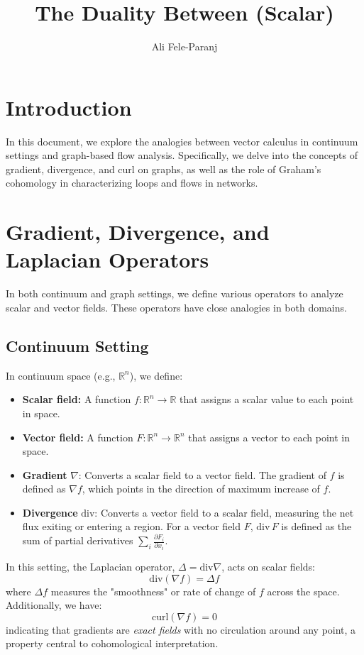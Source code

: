 \documentclass[10pt,a4paper,twocolumn]{article}
\title{The Duality Between (Scalar)}
\author{Ali Fele-Paranj}
\begin{document}
	\maketitle
	
	\section{Introduction}
	In this document, we explore the analogies between vector calculus in continuum settings and graph-based flow analysis. Specifically, we delve into the concepts of gradient, divergence, and curl on graphs, as well as the role of Graham's cohomology in characterizing loops and flows in networks.
	
	\section{Gradient, Divergence, and Laplacian Operators}
	In both continuum and graph settings, we define various operators to analyze scalar and vector fields. These operators have close analogies in both domains.
	
	\subsection{Continuum Setting}
	In continuum space (e.g., $\mathbb{R}^n$), we define:
	\begin{itemize}
		\item \textbf{Scalar field:} A function \( f \colon \mathbb{R}^n \rightarrow \mathbb{R} \) that assigns a scalar value to each point in space.
		\item \textbf{Vector field:} A function \( F \colon \mathbb{R}^n \rightarrow \mathbb{R}^n \) that assigns a vector to each point in space.
		\item \textbf{Gradient} \( \nabla \): Converts a scalar field to a vector field. The gradient of \( f \) is defined as \( \nabla f \), which points in the direction of maximum increase of \( f \).
		\item \textbf{Divergence} \( \text{div} \): Converts a vector field to a scalar field, measuring the net flux exiting or entering a region. For a vector field \( F \), \( \text{div} \, F \) is defined as the sum of partial derivatives \( \sum_{i} \frac{\partial F_i}{\partial x_i} \).
	\end{itemize}
	
	In this setting, the Laplacian operator, \( \Delta = \text{div} \nabla \), acts on scalar fields:
	\[
	\text{div}(\nabla f) = \Delta f
	\]
	where \( \Delta f \) measures the "smoothness" or rate of change of \( f \) across the space. Additionally, we have:
	\[
	\text{curl}(\nabla f) = 0
	\]
	indicating that gradients are \textit{exact fields} with no circulation around any point, a property central to cohomological interpretation.
	
\end{document}
